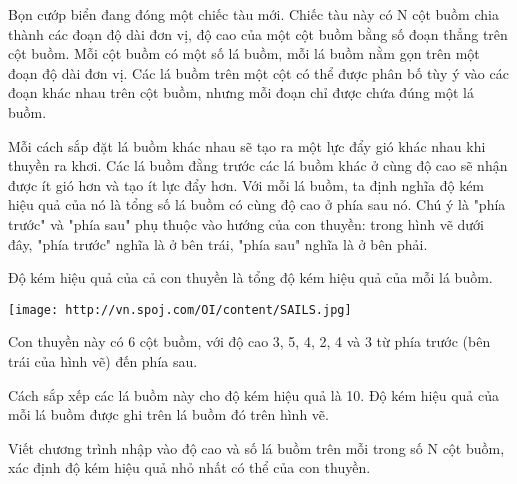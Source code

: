 Bọn cướp biển đang đóng một chiếc tàu mới. Chiếc tàu này có N cột buồm chia thành các đoạn độ dài đơn vị, độ cao của một cột buồm bằng số đoạn thẳng trên cột buồm. Mỗi cột buồm có một số lá buồm, mỗi lá buồm nằm gọn trên một đoạn độ dài đơn vị. Các lá buồm trên một cột có thể được phân bố tùy ý vào các đoạn khác nhau trên cột buồm, nhưng mỗi đoạn chỉ được chứa đúng một lá buồm.  

   Mỗi cách sắp đặt lá buồm khác nhau sẽ tạo ra một lực đẩy gió khác nhau khi thuyền ra khơi. Các lá buồm đằng trước các lá buồm khác ở cùng độ cao sẽ nhận được ít gió hơn và tạo ít lực đẩy hơn. Với mỗi lá buồm, ta định nghĩa độ kém hiệu quả của nó là tổng số lá buồm có cùng độ cao ở phía sau nó. Chú ý là "phía trước" và "phía sau" phụ thuộc vào hướng của con thuyền: trong hình vẽ dưới đây, "phía trước" nghĩa là ở bên trái, "phía sau" nghĩa là ở bên phải.  

   Độ kém hiệu quả của cả con thuyền là tổng độ kém hiệu quả của mỗi lá buồm.  


\texttt{[image: http://vn.spoj.com/OI/content/SAILS.jpg]}

   Con thuyền này có 6 cột buồm, với độ cao 3, 5, 4, 2, 4 và 3 từ phía trước (bên trái của hình vẽ) đến phía sau.  

   Cách sắp xếp các lá buồm này cho độ kém hiệu quả là 10. Độ kém hiệu quả của mỗi lá buồm được ghi trên lá buồm đó trên hình vẽ.  

Viết chương trình nhập vào độ cao và số lá buồm trên mỗi trong số N cột buồm, xác định độ kém hiệu quả nhỏ nhất có thể của con thuyền.